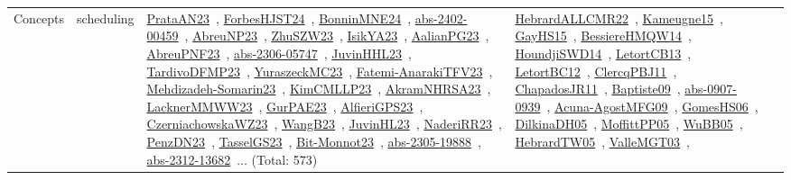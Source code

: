 {\begin{longtable}{lp{3cm}>{\raggedright\arraybackslash}p{6cm}>{\raggedright\arraybackslash}p{6cm}>{\raggedright\arraybackslash}p{8cm}}
Concepts & scheduling & \href{../works/PrataAN23.pdf}{PrataAN23}~\cite{PrataAN23}, \href{../works/ForbesHJST24.pdf}{ForbesHJST24}~\cite{ForbesHJST24}, \href{../works/BonninMNE24.pdf}{BonninMNE24}~\cite{BonninMNE24}, \href{../works/abs-2402-00459.pdf}{abs-2402-00459}~\cite{abs-2402-00459}, \href{../works/AbreuNP23.pdf}{AbreuNP23}~\cite{AbreuNP23}, \href{../works/ZhuSZW23.pdf}{ZhuSZW23}~\cite{ZhuSZW23}, \href{../works/IsikYA23.pdf}{IsikYA23}~\cite{IsikYA23}, \href{../works/AalianPG23.pdf}{AalianPG23}~\cite{AalianPG23}, \href{../works/AbreuPNF23.pdf}{AbreuPNF23}~\cite{AbreuPNF23}, \href{../works/abs-2306-05747.pdf}{abs-2306-05747}~\cite{abs-2306-05747}, \href{../works/JuvinHHL23.pdf}{JuvinHHL23}~\cite{JuvinHHL23}, \href{../works/TardivoDFMP23.pdf}{TardivoDFMP23}~\cite{TardivoDFMP23}, \href{../works/YuraszeckMC23.pdf}{YuraszeckMC23}~\cite{YuraszeckMC23}, \href{../works/Fatemi-AnarakiTFV23.pdf}{Fatemi-AnarakiTFV23}~\cite{Fatemi-AnarakiTFV23}, \href{../works/Mehdizadeh-Somarin23.pdf}{Mehdizadeh-Somarin23}~\cite{Mehdizadeh-Somarin23}, \href{../works/KimCMLLP23.pdf}{KimCMLLP23}~\cite{KimCMLLP23}, \href{../works/AkramNHRSA23.pdf}{AkramNHRSA23}~\cite{AkramNHRSA23}, \href{../works/LacknerMMWW23.pdf}{LacknerMMWW23}~\cite{LacknerMMWW23}, \href{../works/GurPAE23.pdf}{GurPAE23}~\cite{GurPAE23}, \href{../works/AlfieriGPS23.pdf}{AlfieriGPS23}~\cite{AlfieriGPS23}, \href{../works/CzerniachowskaWZ23.pdf}{CzerniachowskaWZ23}~\cite{CzerniachowskaWZ23}, \href{../works/WangB23.pdf}{WangB23}~\cite{WangB23}, \href{../works/JuvinHL23.pdf}{JuvinHL23}~\cite{JuvinHL23}, \href{../works/NaderiRR23.pdf}{NaderiRR23}~\cite{NaderiRR23}, \href{../works/PenzDN23.pdf}{PenzDN23}~\cite{PenzDN23}, \href{../works/TasselGS23.pdf}{TasselGS23}~\cite{TasselGS23}, \href{../works/Bit-Monnot23.pdf}{Bit-Monnot23}~\cite{Bit-Monnot23}, \href{../works/abs-2305-19888.pdf}{abs-2305-19888}~\cite{abs-2305-19888}, \href{../works/abs-2312-13682.pdf}{abs-2312-13682}~\cite{abs-2312-13682}... (Total: 573) & \href{../works/HebrardALLCMR22.pdf}{HebrardALLCMR22}~\cite{HebrardALLCMR22}, \href{../works/Kameugne15.pdf}{Kameugne15}~\cite{Kameugne15}, \href{../works/GayHS15.pdf}{GayHS15}~\cite{GayHS15}, \href{../works/BessiereHMQW14.pdf}{BessiereHMQW14}~\cite{BessiereHMQW14}, \href{../works/HoundjiSWD14.pdf}{HoundjiSWD14}~\cite{HoundjiSWD14}, \href{../works/LetortCB13.pdf}{LetortCB13}~\cite{LetortCB13}, \href{../works/LetortBC12.pdf}{LetortBC12}~\cite{LetortBC12}, \href{../works/ClercqPBJ11.pdf}{ClercqPBJ11}~\cite{ClercqPBJ11}, \href{../works/ChapadosJR11.pdf}{ChapadosJR11}~\cite{ChapadosJR11}, \href{../works/Baptiste09.pdf}{Baptiste09}~\cite{Baptiste09}, \href{../works/abs-0907-0939.pdf}{abs-0907-0939}~\cite{abs-0907-0939}, \href{../works/Acuna-AgostMFG09.pdf}{Acuna-AgostMFG09}~\cite{Acuna-AgostMFG09}, \href{../works/GomesHS06.pdf}{GomesHS06}~\cite{GomesHS06}, \href{../works/DilkinaDH05.pdf}{DilkinaDH05}~\cite{DilkinaDH05}, \href{../works/MoffittPP05.pdf}{MoffittPP05}~\cite{MoffittPP05}, \href{../works/WuBB05.pdf}{WuBB05}~\cite{WuBB05}, \href{../works/HebrardTW05.pdf}{HebrardTW05}~\cite{HebrardTW05}, \href{../works/ValleMGT03.pdf}{ValleMGT03}~\cite{ValleMGT03}, 
\end{longtable}}
